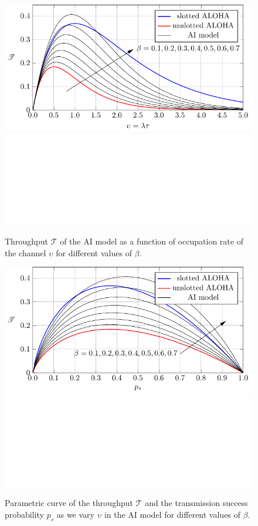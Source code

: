 \begin{figure}[htb]
    \centering
    \if{}
        \includegraphics[]{Figures/Ch5_AI.pdf}
    \else
        \includegraphics[draft, width=\textwidth]{Figures/placeholder.png}
    \fi
    \caption{Throughput $\mathscr{T}$ of the AI model as a function of occupation rate of the channel $\upsilon$ for different values of $\beta$.}
    \label{fig:P2_AI}
\end{figure}%
%
\begin{figure}[htb]
    \centering
    \if{}
        \includegraphics[]{Figures/Ch5_AI_ps.pdf}
    \else
        \includegraphics[draft, width=\textwidth]{Figures/placeholder.png}
    \fi
    \caption{Parametric curve of the throughput $\mathscr{T}$ and the transmission success probability $p_s$ as we vary $\upsilon$ in the AI model for different values of $\beta$.}
    \label{fig:P2_AI_ps}
\end{figure}

